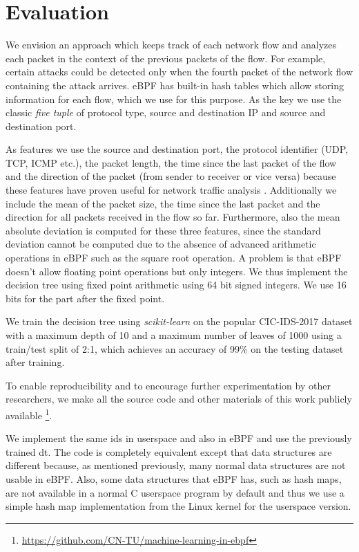 \documentclass[conference]{IEEEtran}
\begin{document}
\section{Evaluation}

We envision an approach which keeps track of each network flow and analyzes each packet in the context of the previous packets of the flow. For example, certain attacks could be detected only when the fourth packet of the network flow containing the attack arrives. eBPF has built-in hash tables which allow storing information for each flow, which we use for this purpose. As the key we use the classic \textit{five tuple} of protocol type, source and destination IP and source and destination port. 


As features we use the source and destination port, the protocol identifier (UDP, TCP, ICMP etc.), the packet length, the time since the last packet of the flow and the direction of the packet (from sender to receiver or vice versa) because these features have proven useful for network traffic analysis \cite{iglesias_ntarc_2020}. Additionally we include the mean of the packet size, the time since the last packet and the direction for all packets received in the flow so far. Furthermore, also the mean absolute deviation is computed for these three features, since the standard deviation cannot be computed due to the absence of advanced arithmetic operations in eBPF such as the square root operation.  A problem is that eBPF doesn't allow floating point operations but only integers. We thus implement the decision tree using fixed point arithmetic using 64 bit signed integers. We use 16 bits for the part after the fixed point.

We train the decision tree using \textit{scikit-learn} on the popular CIC-IDS-2017 dataset \cite{sharafaldin_toward_2018} with a maximum depth of 10 and a maximum number of leaves of 1000 using a train/test split of 2:1, which achieves an accuracy of 99\% on the testing dataset after training. 

To enable reproducibility and to encourage further experimentation by other researchers, we make all the source code and other materials of this work publicly available \footnote{\url{https://github.com/CN-TU/machine-learning-in-ebpf}}.

We implement the same \gls{ids} in userspace and also in eBPF and use the previously trained \gls{dt}. The code is completely equivalent except that data structures are different because, as mentioned previously, many normal data structures are not usable in eBPF. Also, some data structures that eBPF has, such as hash maps, are not available in a normal C userspace program by default and thus we use a simple hash map implementation from the Linux kernel for the userspace version. 
\end{document}
